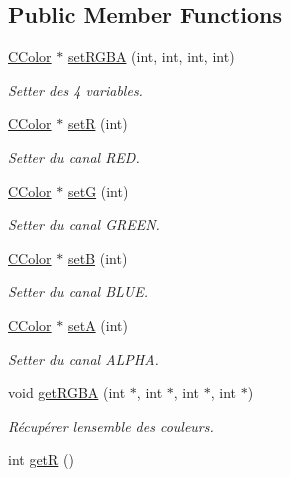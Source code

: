 \subsection*{Public Member Functions}
\begin{DoxyCompactItemize}
\item 
\hyperlink{class_c_color}{C\+Color} $\ast$ \hyperlink{class_c_color_a2e3b83209fb2791bab8a88b833f560e3}{set\+R\+G\+B\+A} (int, int, int, int)
\begin{DoxyCompactList}\small\item\em Setter des 4 variables. \end{DoxyCompactList}\item 
\hyperlink{class_c_color}{C\+Color} $\ast$ \hyperlink{class_c_color_a6efe4461a19fbb302164c38937857c66}{set\+R} (int)
\begin{DoxyCompactList}\small\item\em Setter du canal R\+E\+D. \end{DoxyCompactList}\item 
\hyperlink{class_c_color}{C\+Color} $\ast$ \hyperlink{class_c_color_a942994c75b4d2e416426dc9ec962827b}{set\+G} (int)
\begin{DoxyCompactList}\small\item\em Setter du canal G\+R\+E\+E\+N. \end{DoxyCompactList}\item 
\hyperlink{class_c_color}{C\+Color} $\ast$ \hyperlink{class_c_color_a7a4b8c07c933b84a15a4d47099acc874}{set\+B} (int)
\begin{DoxyCompactList}\small\item\em Setter du canal B\+L\+U\+E. \end{DoxyCompactList}\item 
\hyperlink{class_c_color}{C\+Color} $\ast$ \hyperlink{class_c_color_a2f83c38be2986b5a08ff65466593b8b4}{set\+A} (int)
\begin{DoxyCompactList}\small\item\em Setter du canal A\+L\+P\+H\+A. \end{DoxyCompactList}\item 
void \hyperlink{class_c_color_a8fdd128cecfb6b695bd73bba71e29f5f}{get\+R\+G\+B\+A} (int $\ast$, int $\ast$, int $\ast$, int $\ast$)
\begin{DoxyCompactList}\small\item\em Récupérer l\textquotesingle{}ensemble des couleurs. \end{DoxyCompactList}\item 
int \hyperlink{class_c_color_a774523949afb152bbf2d2a649768088a}{get\+R} ()

\end{DoxyCompactItemize}
